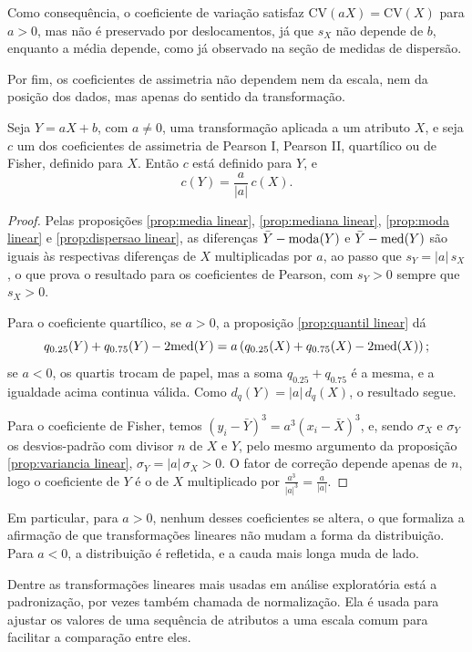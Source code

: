 Como consequência, o coeficiente de variação satisfaz $\mathrm{CV}(aX) = \mathrm{CV}(X)$
para $a > 0$, mas não é preservado por deslocamentos, já que $s_X$ não depende de $b$,
enquanto a média depende, como já observado na seção de medidas de dispersão.

Por fim, os coeficientes de assimetria não dependem nem da escala, nem da posição dos
dados, mas apenas do sentido da transformação.

\begin{prop:assimetria linear}
\label{prop:assimetria linear}
Seja $Y=aX+b$, com $a \neq 0$, uma transformação aplicada a um atributo $X$, e seja $c$ um
dos coeficientes de assimetria de Pearson I, Pearson II, quartílico ou de Fisher, definido
para $X$.
Então $c$ está definido para $Y$, e
\[
    c(Y) = \frac{a}{|a|}\, c(X).
\]
\end{prop:assimetria linear}
\begin{proof}
Pelas proposições \ref{prop:media linear}, \ref{prop:mediana linear},
\ref{prop:moda linear} e \ref{prop:dispersao linear}, as diferenças $\bar Y - \mathrm{moda}\!\left(Y\right)$ e
$\bar Y - \mathrm{med}\!\left(Y\right)$ são iguais às respectivas diferenças de $X$ multiplicadas por $a$, ao
passo que $s_Y = |a|\, s_X$, o que prova o resultado para os coeficientes de Pearson,
com $s_Y > 0$ sempre que $s_X > 0$.

Para o coeficiente quartílico, se $a > 0$, a proposição \ref{prop:quantil linear} dá
\[
    q_{0.25}(Y) + q_{0.75}(Y) - 2\mathrm{med}\!\left(Y\right)
        = a\left(q_{0.25}(X) + q_{0.75}(X) - 2\mathrm{med}\!\left(X\right)\right);
\]
se $a < 0$, os quartis trocam de papel, mas a soma $q_{0.25} + q_{0.75}$ é a mesma, e a
igualdade acima continua válida.
Como $d_q(Y) = |a|\, d_q(X)$, o resultado segue.

Para o coeficiente de Fisher, temos $(y_i - \bar Y)^3 = a^3 (x_i - \bar X)^3$, e, sendo
$\sigma_X$ e $\sigma_Y$ os desvios-padrão com divisor $n$ de $X$ e $Y$, pelo mesmo
argumento da proposição \ref{prop:variancia linear}, $\sigma_Y = |a|\,\sigma_X > 0$.
O fator de correção depende apenas de $n$, logo o coeficiente de $Y$ é o de $X$
multiplicado por $\frac{a^3}{|a|^3} = \frac{a}{|a|}$.
\end{proof}

Em particular, para $a > 0$, nenhum desses coeficientes se altera, o que formaliza a
afirmação de que transformações lineares não mudam a forma da distribuição.
Para $a < 0$, a distribuição é refletida, e a cauda mais longa muda de lado.

Dentre as transformações lineares mais usadas em análise exploratória está a padronização,
por vezes também chamada de normalização.
Ela é usada para ajustar os valores de uma sequência de atributos a uma escala comum
para facilitar a comparação entre eles.

